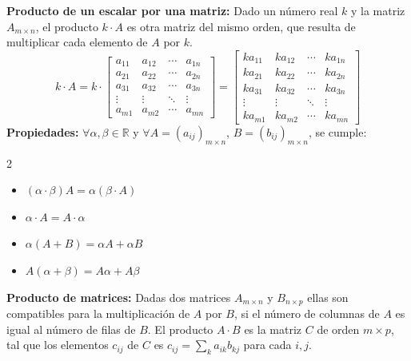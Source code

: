 \documentclass[11pt,a4paper]{article}
\newcommand{\hl}[1]{\textcolor{resaltado}{#1}}
\begin{document}
\medskip
\textbf{Producto de un escalar por una matriz:} Dado un número real $k$ y la matriz
$A_{m\times n}$, el producto $k\cdot A$ es otra matriz del mismo orden, que resulta de
multiplicar cada elemento de $A$ por $k$.
\[
k\cdot A = k\cdot\begin{bmatrix}
a_{11} & a_{12} & \cdots & a_{1n}\\
a_{21} & a_{22} & \cdots & a_{2n}\\
a_{31} & a_{32} & \cdots & a_{3n}\\
\vdots & \vdots & \ddots & \vdots\\
a_{m1} & a_{m2} & \cdots & a_{mn}
\end{bmatrix}
=
\begin{bmatrix}
k a_{11} & k a_{12} & \cdots & k a_{1n}\\
k a_{21} & k a_{22} & \cdots & k a_{2n}\\
k a_{31} & k a_{32} & \cdots & k a_{3n}\\
\vdots & \vdots & \ddots & \vdots\\
k a_{m1} & k a_{m2} & \cdots & k a_{mn}
\end{bmatrix}
\]
\textbf{Propiedades:} $\forall \alpha, \beta \in \mathbb{R}$ y $\forall A = (a_{ij})_{m\times n}$,
$B = (b_{ij})_{m\times n}$, se cumple:
\begin{multicols}{2}
\begin{itemize}[label=\textcolor{naranja}{\checkmark}]
  \item $(\alpha\cdot\beta)A = \alpha(\beta\cdot A)$
  \item $\alpha\cdot A = A\cdot\alpha$
  \item $\alpha(A + B) = \alpha A + \alpha B$
  \item $A(\alpha + \beta) = A\alpha + A\beta$
\end{itemize}
\end{multicols}

\textbf{Producto de matrices:} Dadas dos matrices $A_{m\times n}$ y $B_{n\times p}$ ellas son
compatibles para la multiplicación de $A$ por $B$, si el número de columnas de $A$ es igual
al número de filas de $B$. El producto $A\cdot B$ es la matriz $C$ de orden $m\times p$, tal
que los elementos $c_{ij}$ de $C$ es \hl{$c_{ij} = \displaystyle\sum_{k} a_{ik}b_{kj}$} para
cada $i, j$.
\end{document}
